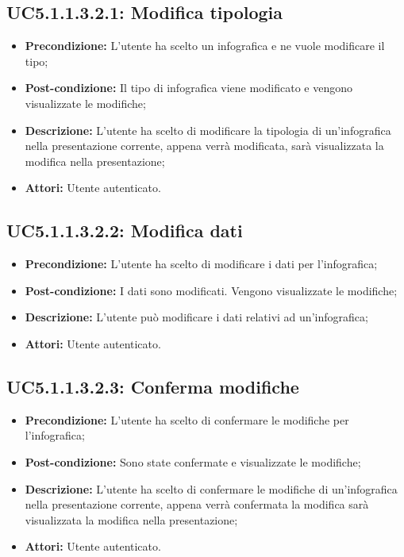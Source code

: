 \subsection{ UC5.1.1.3.2.1: Modifica tipologia}

\begin{itemize}
	\item \textbf{Precondizione:} L'utente ha scelto un infografica e ne vuole modificare il tipo;
	\item \textbf{Post-condizione:} Il tipo di infografica viene modificato e vengono visualizzate le modifiche;
	\item \textbf{Descrizione:} L'utente ha scelto di modificare la tipologia di un'infografica nella presentazione corrente, appena verrà modificata, sarà visualizzata la modifica nella presentazione;
	\item \textbf{Attori:} Utente autenticato.
\end{itemize}
\subsection{ UC5.1.1.3.2.2: Modifica dati}

\begin{itemize}
	\item \textbf{Precondizione:} L'utente ha scelto di modificare i dati per l'infografica;
	\item \textbf{Post-condizione:} I dati sono modificati. Vengono visualizzate le modifiche;
	\item \textbf{Descrizione:} L'utente può modificare i dati relativi ad un'infografica;
	\item \textbf{Attori:} Utente autenticato.
\end{itemize}
\subsection{ UC5.1.1.3.2.3: Conferma modifiche}

\begin{itemize}
	\item \textbf{Precondizione:} L'utente ha scelto di confermare le modifiche per l'infografica;
	\item \textbf{Post-condizione:} Sono state confermate e visualizzate le modifiche;
	\item \textbf{Descrizione:} L'utente ha scelto di confermare le modifiche di un'infografica nella presentazione corrente, appena verrà confermata la modifica sarà visualizzata la modifica nella presentazione;
	\item \textbf{Attori:} Utente autenticato.
\end{itemize}
